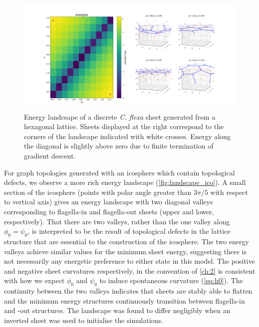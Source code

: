 \begin{figure}
	\centering
	\includegraphics[width=\textwidth]{landscape_flat.png}
	\caption[Energy landscape of a discrete \textit{C. flexa} sheet generated from a hexagonal lattice]{Energy landcsape of a discrete \textit{C. flexa} sheet generated from a hexagonal lattice. Sheets displayed at the right correspond to the corners of the landscape indicated with white crosses. Energy along the diagonal is slightly above zero due to finite termination of gradient descent.}
	\label{fig:landscape_flat}
\end{figure}

For graph topologies generated with an icosphere which contain topological defects, we observe a more rich energy landscape (\cref{fig:landscape_ico}).
A small section of the icosphere (points with polar angle greater than $3\pi/5$ with respect to vertical axis) gives an energy landscape with two diagonal valleys corresponding to flagella-in and flagella-out sheets (upper and lower, respectively).
That there are two valleys, rather than the one valley along $\phi_0 = \psi_0$, is interpreted to be the result of topological defects in the lattice structure that are essential to the construction of the icosphere. 
The two energy valleys achieve similar values for the minimum sheet energy, suggesting there is not necessarily any energetic preference to either state in this model.
The positive and negative sheet curvatures respectively, in the convention of \cref{ch:2} is consistent with how we expect $\phi_0$ and $\psi_0$ to induce spontaneous curvature (\cref{eq:h0}).
The continuity between the two valleys indicates that sheets are stably able to flatten and the minimum energy structures continuously transition between flagella-in and -out structures. 
The landscape was found to differ negligibly when an inverted sheet was used to initialise the simulations.

